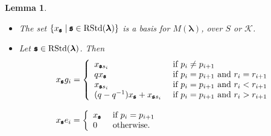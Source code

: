 \documentclass[10pt,a4,twoside,hidelinks,rm]{article}
\newcommand{\kk}{\mathcal{K}}
\newcommand{\Bs}{\pmb{\mathfrak{s}}}
\newcommand{\rstd}{{\rm RStd}}
\newcommand\blambda{{\boldsymbol\lambda}}
\theoremstyle{plain}
\newtheorem{lem}[teo]{Lemma}
\begin{document}
\begin{lem}\label{descr}
  \begin{itemize}
\setlength\itemsep{-1.5em}
\item[(1)] The set $\{ x_{\Bs } \mid \Bs \in \rstd(\blambda) \} $ is a basis for $ M(\blambda)  $,
  over $ S $ or $ \kk$.
  \newline
\item[(2)]
  Let $  \Bs  \in \rstd(\blambda)$. Then
\begin{equation}{\label{actiongi}}
\begin{array}{l}
  x_{\Bs}  g_i=\left\{\begin{array}{ll} x_{\Bs s_i}    &\mbox{ if } p_i \neq p_{i+1}  \\
q x_{\Bs }         &\mbox{ if } p_i = p_{i+1} \mbox{ and } r_i= r_{i+1}  \\
 x_{\Bs s_i}     &\mbox{ if }p_i = p_{i+1} \mbox{ and } r_i < r_{i+1} \\
(q-q^{-1}) x_{\Bs }     +  x_{\Bs s_i}     &\mbox{ if }
p_i = p_{i+1} \mbox{ and } r_i > r_{i+1}
\end{array}\right.
\\ \\
x_{\Bs}  e_i=\left\{\begin{array}{ll} x_{\Bs}    &\mbox{ if } p_i = p_{i+1}  \\
0         &\mbox{ otherwise.} 
\end{array}\right.
\end{array}
\end{equation}
\end{itemize}
\end{lem}
\end{document}
